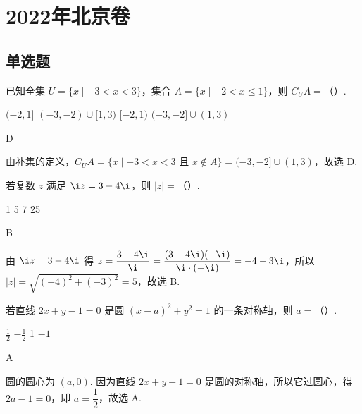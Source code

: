 \chapter{2022年北京卷}

\section{单选题}

\begin{problem}
已知全集 \(U=\{x\mid -3<x<3\}\)，集合 \(A=\{x\mid -2<x\le 1\}\)，则 \(C_UA=\)（\quad）.

\choices
    {\((-2,1]\)}
    {\((-3,-2)\cup[1,3)\)}
    {\([-2,1)\)}
    {\((-3,-2]\cup(1,3)\)}
\end{problem}

\begin{answer}
D
\end{answer}

\begin{solution}
由补集的定义，\(C_UA=\{x\mid -3<x<3\text{ 且 }x\notin A\}=(-3,-2]\cup(1,3)\)，故选 D.
\end{solution}

\begin{problem}
若复数 \(z\) 满足 \(\i z=3-4\i\)，则 \(|z|=\)（\quad）.

\choices
    {1}
    {5}
    {7}
    {25}
\end{problem}

\begin{answer}
B
\end{answer}

\begin{solution}
由 \(\i z=3-4\i\) 得 \(z=\dfrac{3-4\i}{\i}=\dfrac{(3-4\i)(-\i)}{\i\cdot(-\i)}=-4-3\i\)，所以 \(|z|=\sqrt{(-4)^2+(-3)^2}=5\)，故选 B.
\end{solution}

\begin{problem}
若直线 \(2x+y-1=0\) 是圆 \((x-a)^2+y^2=1\) 的一条对称轴，则 \(a=\)（\quad）.

\choices
    {\(\frac12\)}
    {\(-\frac12\)}
    {1}
    {\(-1\)}
\end{problem}

\begin{answer}
A
\end{answer}

\begin{solution}
圆的圆心为 \((a,0)\). 因为直线 \(2x+y-1=0\) 是圆的对称轴，所以它过圆心，得 \(2a-1=0\)，即 \(a=\dfrac12\)，故选 A.
\end{solution}


